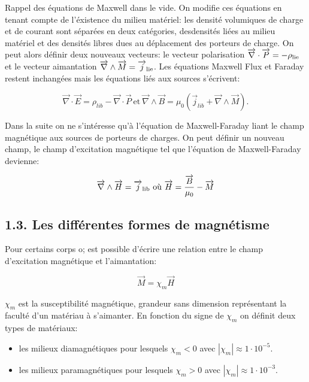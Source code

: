 \documentclass[french, a4paper, 10pt, twocolumn, landscape]{article}
\begin{document}
Rappel des équations de Maxwell dans le vide.
On modifie ces équations en tenant compte de l'éxistence du milieu matériel: les densité volumiques de charge et de courant sont séparées en deux catégories, desdensités liées au milieu matériel et des densités libres  dues au déplacement des porteurs de charge. On peut alors définir deux nouveaux vecteurs: le vecteur polarisation $\vec{\nabla}\cdot \vec{P}=-\rho_{\rm lie}$ et le vecteur aimantation $\vec{\nabla}\wedge \vec{M}=\vec{j}_{\rm lie}$. Les équations Maxwell Flux et Faraday restent inchangées mais les équations liés aux sources s'écrivent:

\begin{equation}
    \vec{\nabla}\cdot \vec{E}=\rho_{lib}-\vec{\nabla}\cdot \vec{P}~\text{et}~\vec{\nabla}\wedge \vec{B}=\mu_0\left(\vec{j}_{lib}+\vec{\nabla}\wedge\vec{M}\right).
\end{equation}

Dans la suite on ne s'intéresse qu'à l'équation de Maxwell-Faraday liant le champ magnétique aux sources de porteurs de charges. On peut définir un nouveau champ, le champ d'excitation magnétique tel que l'équation de Maxwell-Faraday devienne: 

\begin{equation}
    \vec{\nabla}\wedge \vec{H}=\vec{j}_{\rm lib}~\text{où}~\vec{H}=\dfrac{\vec{B}}{\mu_0}-\vec{M}
\end{equation}


\subsection*{1.3. Les différentes formes de magnétisme}

Pour certains corps o; est possible d'écrire une relation entre le champ d'excitation magnétique et l'aimantation:

\begin{equation}
    \vec{M}=\chi_m\vec{H}
\end{equation}

$\chi_m$ est la susceptibilité magnétique, grandeur sans dimension représentant la faculté d'un matériau à s'aimanter. En fonction du signe de $\chi_m$ on définit deux types de matériaux:

\begin{itemize}
    \item les milieux diamagnétiques pour lesquels $\chi_m<0$ avec $|\chi_m|\approx 1\cdot10^{-5}$.
    \item les milieux paramagnétiques pour lesquels $\chi_m>0$ avec $|\chi_m|\approx 1\cdot10^{-3}$.
\end{itemize}
\end{document}
